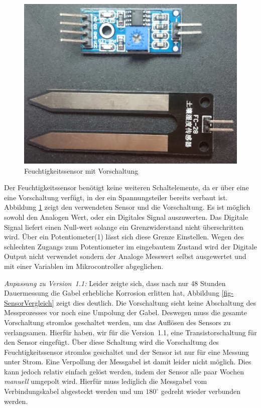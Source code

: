 ﻿\documentclass[]{IEEEtran}
\begin{document}
\begin{figure}[!h]
	\centering
	\includegraphics[width=0.8\linewidth]{bilder/_feuchteSensor1.jpg}
	\caption{Feuchtigkeitssensor mit Vorschaltung}
	\label{fig-SensorVorschaltung}
\end{figure}
Der Feuchtigkeitssensor benötigt keine weiteren Schaltelemente, da er über eine eine Vorschaltung verfügt, in der ein Spannungsteiler bereits verbaut ist. 
Abbildung \ref{fig-SensorVorschaltung} zeigt den verwendeten Sensor und die Vorschaltung. 
Es ist möglich sowohl den Analogen Wert, oder ein Digitales Signal auszuwerten. Das Digitale Signal liefert einen Null-wert solange ein Grenzwiderstand nicht überschritten wird. Über ein  Potentiometer(1) lässt sich diese Grenze Einstellen. Wegen des schlechten Zugangs zum Potentiometer im eingebautem Zustand wird der Digitale Output nicht verwendet sondern der Analoge Messwert selbst ausgewertet und mit einer Variablen im Mikrocontroller abgeglichen.
		
\emph{Anpassung zu Version~1.1:}
Leider zeigte sich, dass nach nur 48 Stunden Dauermessung die Gabel erhebliche Korrosion erlitten hat, Abbildung \ref{fig-SensorVergleich} zeigt dies deutlich.
Die Vorschaltung sieht keine Abschaltung des Messprozesses vor noch eine Umpolung der Gabel. Deswegen muss die gesamte Vorschaltung stromlos geschaltet werden, um das Auflösen des Sensors zu verlangsamen. Hierfür haben, wir für die Version~1.1, eine Transistorschaltung für den Sensor eingefügt. Über diese Schaltung wird die Vorschaltung des Feuchtigkeitssensor stromlos geschaltet und der Sensor ist nur für eine Messung unter Strom. Eine Verpollung der Messgabel ist damit leider nicht möglich. Dies kann jedoch relativ einfach gelöst werden, indem der Sensor alle paar Wochen \emph{manuell} umgepolt wird. Hierfür muss lediglich die Messgabel vom Verbindungskabel abgesteckt werden und um \begin{math}180^{\circ}\end{math} gedreht wieder verbunden werden.
\end{document}

